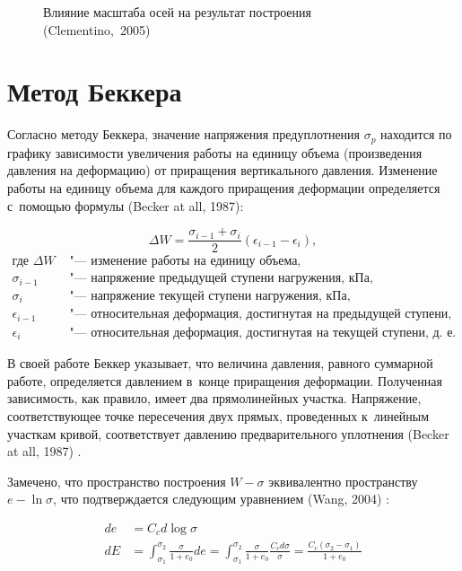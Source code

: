  \begin{figure}
    \centering
    \small
    
    \caption{Влияние масштаба осей на результат построения (Clementino,~2005)~\cite{clementino2005}}
    \label{fig:ellipse}
\end{figure}
    
\section{Метод Беккера}

Согласно методу Беккера, значение напряжения предуплотнения $\sigma_p$ находится по графику зависимости увеличения работы на единицу объема (произведения давления на деформацию) от приращения вертикального давления.
Изменение работы на единицу объема для каждого приращения деформации определяется с~помощью формулы (Becker at all, 1987)\cite{becker1987}:

\begin{equation}
  \label{eq:deltaw}
  \Delta W = \frac{\sigma_{i-1} + \sigma_i}{2} (\epsilon_{i-1} - \epsilon_i),
\end{equation}
\begin{align*}
  \text{где }
  \Delta W & 
  \text{ "--- изменение работы на единицу объема,} \\
  \sigma_{i-1} & 
  \text{ "--- напряжение предыдущей ступени нагружения, кПа,} \\
  \sigma_i & 
  \text{ "--- напряжение текущей ступени нагружения, кПа,} \\
  \epsilon_{i-1} & 
  \text{ "--- относительная деформация, достигнутая на предыдущей ступени, д.~е.,} \\
  \epsilon_i & 
  \text{ "--- относительная деформация, достигнутая на текущей ступени, д.~е.}
\end{align*}

В своей работе Беккер указывает, что величина давления, равного суммарной работе, определяется давлением в~конце приращения деформации. 
Полученная зависимость, как правило, имеет два прямолинейных участка. 
Напряжение, соответствующее точке пересечения двух прямых, проведенных к~линейным участкам кривой, соответствует давлению предварительного уплотнения (Becker at all, 1987) \cite{becker1987}.

Замечено, что пространство построения $W - \sigma$ эквивалентно пространству $e - \ln \sigma$, что подтверждается следующим уравнением (Wang, 2004) \cite{wang2004}: 


\begin{subequations}
  \label{eq:Maxwell}
  \begin{align}
    \label{eq:eqw_1}
    de & = C_c d \log\sigma \\
    \label{eq:eqw_2}
    dE & = \int_{\sigma_1}^{\sigma_2} \frac{\sigma}{1+e_0} de 
    = \int_{\sigma_1}^{\sigma_2} \frac{\sigma}{1+e_0} \frac{C_c d\sigma}{\sigma}
    = \frac{C_c (\sigma_2-\sigma_1)}{1+e_0}
  \end{align}
\end{subequations}

